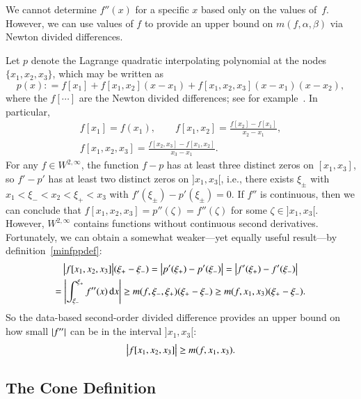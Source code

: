 \documentclass[review]{elsarticle}
\theoremstyle{definition}
\renewcommand{\cw}{W}
\begin{document}
We cannot determine $f''(x)$ for a specific $x$ based only on the values of~$f$. However,
we can use values of $f$ to provide an upper bound on $m(f,\alpha, \beta)$ via Newton divided differences.

Let $p$ denote the Lagrange quadratic interpolating polynomial at the nodes
$\{x_1, x_2, x_3\}$, which may be written as
\begin{equation*}
p(x) : = f[x_1] + f[x_1, x_2](x-x_1) + f[x_1, x_2, x_3](x-x_1)(x-x_2),
\end{equation*}
where the $f[\cdots]$ are the Newton divided differences; see for example~\cite{CheKin12a}. In particular,
\begin{gather}
\nonumber
f[x_1] = f(x_1), \qquad f[x_1, x_2] = \frac{f[x_2] - f[x_1]}{x_2-x_1},  \\
f[x_1, x_2,x_3] = \frac{f[x_2,x_3] - f[x_1,x_2]}{x_3-x_1}. \label{divdiff}
\end{gather}
For any $f \in
\cw^{2,\infty}$, the function $f - p$ has at least three distinct zeros on
$[x_1, x_3]$, so $f' - p'$ has at least two distinct zeros on $]x_1, x_3[$,
i.e., there exists $\xi_\pm$ with $x_1 < \xi_- < x_2 < \xi_+ < x_3$ with
$f'(\xi_\pm) - p'(\xi_{\pm}) = 0$. If $f''$ is continuous, then we can conclude
that $ f[x_1, x_2, x_3]= p''(\zeta) =f''(\zeta) $ for some $\zeta \in ]x_1,
x_3[$. However, $\cw^{2,\infty}$ contains functions without continuous
second derivatives. Fortunately, we can obtain a somewhat weaker---yet equally useful result---by  definition~\eqref{minfppdef}:
\begin{multline*}
\bigl \lvert f[x_1, x_2, x_3] \bigr \rvert(\xi_+  - \xi_-) = \left \lvert p'(\xi_+) - p'(\xi_-) \right \rvert =  \left \lvert f'(\xi_+) - f'(\xi_-) \right \rvert \\
= \left \lvert \int_{\xi_-}^{\xi_+} f''(x) \, {\rm d} x \right \rvert \ge m(f,\xi_-, \xi_+) (\xi_+  - \xi_-)  \ge m(f,x_1, x_3) (\xi_+  - \xi_-) .
\end{multline*}
So the data-based second-order divided difference provides an upper
bound on how small $\left \lvert f'' \right \rvert$ can be in the interval $]x_1, x_3[$:
\begin{equation} \label{NDDbdm}
\bigl \lvert f[x_1, x_2, x_3] \bigr \rvert \ge m(f,x_1, x_3).
\end{equation}

\subsection{The Cone Definition}  \label{sec:conedef}
\end{document}
